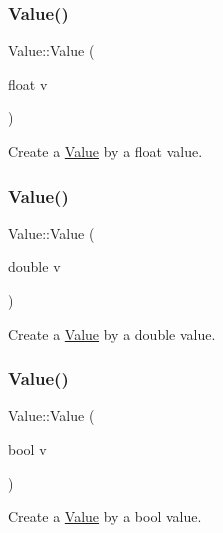 \subsubsection{\texorpdfstring{Value()}{Value()}\hspace{0.1cm}{\footnotesize\ttfamily [22/34]}}
{\footnotesize\ttfamily Value\+::\+Value (\begin{DoxyParamCaption}\item[{float}]{v }\end{DoxyParamCaption})\hspace{0.3cm}{\ttfamily [explicit]}}

Create a \hyperlink{classValue}{Value} by a float value. \mbox{\label{classValue_ac23a80a895f9777f1c7f61f62483d632}} 
\subsubsection{\texorpdfstring{Value()}{Value()}\hspace{0.1cm}{\footnotesize\ttfamily [23/34]}}
{\footnotesize\ttfamily Value\+::\+Value (\begin{DoxyParamCaption}\item[{double}]{v }\end{DoxyParamCaption})\hspace{0.3cm}{\ttfamily [explicit]}}

Create a \hyperlink{classValue}{Value} by a double value. \mbox{\label{classValue_acbcf978c0d65b9b506277cc11bc49c8e}} 
\subsubsection{\texorpdfstring{Value()}{Value()}\hspace{0.1cm}{\footnotesize\ttfamily [24/34]}}
{\footnotesize\ttfamily Value\+::\+Value (\begin{DoxyParamCaption}\item[{bool}]{v }\end{DoxyParamCaption})\hspace{0.3cm}{\ttfamily [explicit]}}

Create a \hyperlink{classValue}{Value} by a bool value. \mbox{\label{classValue_a7db8cffa4a718b7d80ddd6a9a7ce39db}} 
